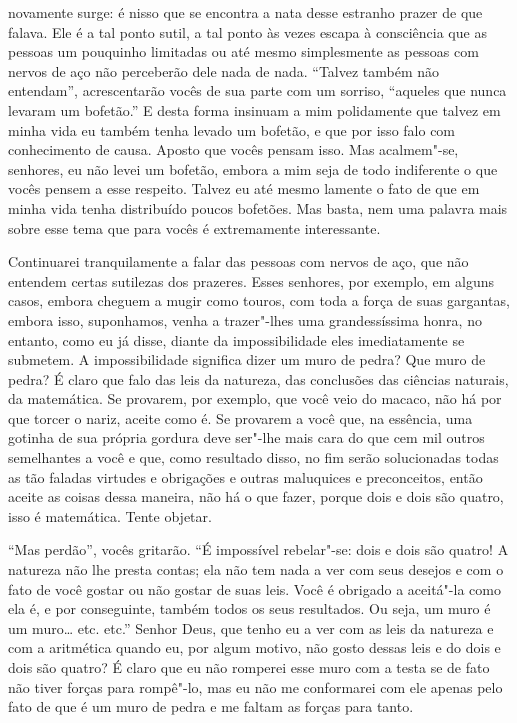 novamente surge: é nisso que se encontra a nata desse estranho prazer de que
falava. Ele é a tal ponto sutil, a tal ponto às vezes escapa à consciência que
as pessoas um pouquinho limitadas ou até mesmo simplesmente as pessoas com
nervos de aço não perceberão dele nada de nada. ``Talvez também não entendam'',
acrescentarão vocês de sua parte com um sorriso, ``aqueles que nunca levaram um
bofetão.'' E desta forma insinuam a mim polidamente que talvez em minha vida eu
também tenha levado um bofetão, e que por isso falo com conhecimento de causa.
Aposto que vocês pensam isso. Mas acalmem"-se, senhores, eu não levei um
bofetão, embora a mim seja de todo indiferente o que vocês pensem a esse
respeito. Talvez eu até mesmo lamente o fato de que em minha vida tenha
distribuído poucos bofetões. Mas basta, nem uma palavra mais sobre esse tema
que para vocês é extremamente interessante.

Continuarei tranquilamente a falar das pessoas com nervos de aço, que
não entendem certas sutilezas dos prazeres. Esses senhores, por
exemplo, em alguns casos, embora cheguem a mugir como touros, com toda
a força de suas gargantas, embora isso, suponhamos, venha a trazer"-lhes
uma grandessíssima honra, no entanto, como eu já disse, diante da
impossibilidade eles imediatamente se submetem. A impossibilidade
significa dizer um muro de pedra? Que muro de pedra? É claro que falo
das leis da natureza, das conclusões das ciências naturais, da
matemática. Se provarem, por exemplo, que você veio do macaco, não há
por que torcer o nariz, aceite como é. Se provarem a você que, na
essência, uma gotinha de sua própria gordura deve ser"-lhe mais cara do
que cem mil outros semelhantes a você e que, como resultado disso, no
fim serão solucionadas todas as tão faladas virtudes e obrigações e
outras maluquices e preconceitos, então aceite as coisas dessa maneira,
não há o que fazer, porque dois e dois são quatro, isso é matemática.
Tente objetar.

``Mas perdão'', vocês gritarão. ``É impossível rebelar"-se: dois e dois são
quatro! A natureza não lhe presta contas; ela não tem nada a ver com
seus desejos e com o fato de você gostar ou não gostar de suas leis.
Você é obrigado a aceitá"-la como ela é, e por conseguinte, também todos
os seus resultados. Ou seja, um muro é um muro\ldots{} etc. etc.'' Senhor
Deus, que tenho eu a ver com as leis da natureza e com a aritmética
quando eu, por algum motivo, não gosto dessas leis e do dois e dois são
quatro? É claro que eu não romperei esse muro com a testa se de fato
não tiver forças para rompê"-lo, mas eu não me conformarei com ele
apenas pelo fato de que é um muro de pedra e me faltam as forças para
tanto.

